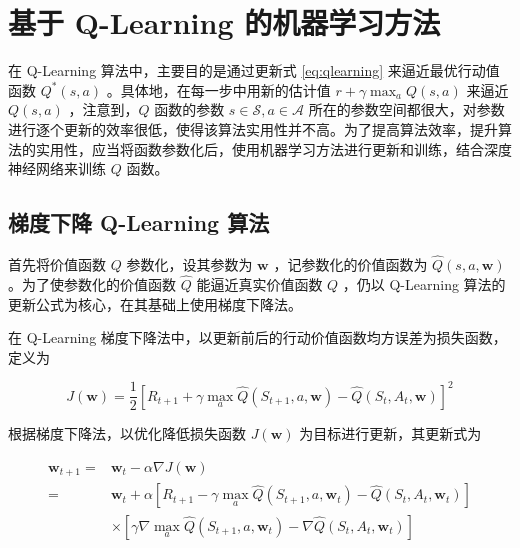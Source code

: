 \chapter{基于 Q-Learning 的机器学习方法}

在 Q-Learning 算法中，主要目的是通过更新式 \ref{eq:qlearning} 来逼近最优行动值函数 $Q^*(s,a)$ 。具体地，在每一步中用新的估计值 $r+\gamma \max_aQ(s,a)$ 来逼近 $Q(s,a)$ ，注意到，$Q$ 函数的参数 $s\in\mathcal S, a\in\mathcal A$ 所在的参数空间都很大，对参数进行逐个更新的效率很低，使得该算法实用性并不高。为了提高算法效率，提升算法的实用性，应当将函数参数化后，使用机器学习方法进行更新和训练，结合深度神经网络来训练 $Q$ 函数。

\section{梯度下降 Q-Learning 算法}

首先将价值函数 $Q$ 参数化，设其参数为 $\boldsymbol{w}$ ，记参数化的价值函数为 $\widehat{Q}(s,a,\boldsymbol{w})$。为了使参数化的价值函数 $\widehat{Q}$ 能逼近真实价值函数 $Q$ ，仍以 Q-Learning 算法的更新公式为核心，在其基础上使用梯度下降法\cite{tsitsiklis1997analysis}\cite{bottou2010large}\cite{sutton2009fast}。

在 Q-Learning 梯度下降法中，以更新前后的行动价值函数均方误差为损失函数，定义为

\begin{equation}
    J(\boldsymbol{w}) = \frac{1}{2}\left[R_{t+1}+\gamma\max_a\widehat{Q}(S_{t+1},a,\boldsymbol{w})-\widehat{Q}(S_t,A_t,\boldsymbol{w})\right]^2
\end{equation}

根据梯度下降法，以优化降低损失函数 $J(\boldsymbol{w})$ 为目标进行更新，其更新式为

\begin{equation}\label{eq:qlearninggrad}
\begin{aligned} \boldsymbol{w}_{t+1} =&\boldsymbol{w}_{t}-\alpha\nabla J(\boldsymbol{w}) \\ =&\boldsymbol{w}_{t}+\alpha\left[R_{t+1} - \gamma \max _{a} \widehat{Q}\left(S_{t+1}, a, \boldsymbol{w}_{t}\right)-\widehat{Q}\left(S_{t}, A_{t}, \boldsymbol{w}_{t}\right)\right]\\&\times\left[\gamma\nabla \max _{a} \widehat{Q}\left(S_{t+1}, a, \boldsymbol{w}_{t}\right)-\nabla \widehat{Q}\left(S_{t}, A_{t}, \boldsymbol{w}_{t}\right)\right] \end{aligned}
\end{equation}

